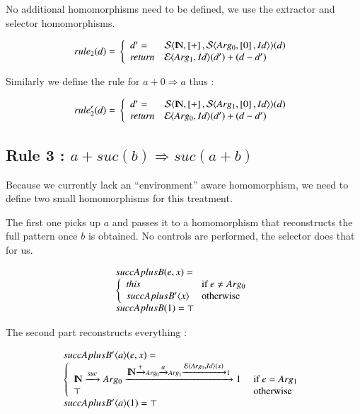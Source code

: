 No additional homomorphisms need to be defined, we use the extractor and selector homomorphisms.


$$
rule_2 (d) =  \\
\left\{\begin{array}{ll}
d' = &  {\cal S}\langle {\mbox{${\rm I\!N}$},\left[+\right],{\cal S}\ensuremath{\langle {Arg_0,\left[0\right],Id} \rangle}} \rangle (d) \\
\mathit{return} &  {\cal E}\langle {Arg_1,Id} \rangle (d') + (d-d')
 \end{array}
\right. \\
$$

Similarly we define the rule for  $a + 0 \Rightarrow a$ thus :

$$
rule_2' (d) =  \\
\left\{\begin{array}{ll}
d' = &  {\cal S}\langle {\mbox{${\rm I\!N}$},\left[+\right],{\cal S}\ensuremath{\langle {Arg_1,\left[0\right],Id} \rangle}} \rangle (d) \\
\mathit{return} &  {\cal E}\langle {Arg_0,Id} \rangle (d') + (d-d')
 \end{array}
\right. \\
$$


\subsection{Rule 3 : $a + suc(b) \Rightarrow suc (a + b)$}

Because we currently lack an ``environment'' aware homomorphism, we
need to define two small homomorphisms for this treatment.

The first one picks up $a$ and passes it to a homomorphism that
reconstructs the full pattern once $b$ is obtained.  No controls are
performed, the selector does that for us.


$$
\begin{array}{lcl}
{succAplusB} (e,x)= \\
\left\{\begin{array}{ll}
 \mathit{this} & \mbox{ if } e \neq Arg_0 \\
 succAplusB'\langle {x} \rangle  & \mbox{ otherwise } \\
\end{array}
\right. \\
 succAplusB (1) = \top 
\end{array}
$$

The second part reconstructs everything :

$$
\begin{array}{lcl}
{succAplusB'}\langle {a} \rangle (e,x)= \\
\left\{\begin{array}{ll}
\mbox{${\rm I\!N}$} \xrightarrow{\scriptstyle {suc}} {Arg_0} \xrightarrow{\scriptstyle {\mbox{${\rm I\!N}$}\ensuremath{\xrightarrow{\scriptstyle {+}}} {Arg_0} \ensuremath{\xrightarrow{\scriptstyle {a}}} {Arg_1} \ensuremath{\xrightarrow{\scriptstyle { {\cal E}\ensuremath{\langle {Arg_0,Id} \rangle}(x) }}} 1  }} 1 & \mbox{ if } e = Arg_1 \\
\top  & \mbox{ otherwise } \\
\end{array}
\right. \\
 succAplusB'\langle {a} \rangle (1) = \top 
\end{array}
$$


